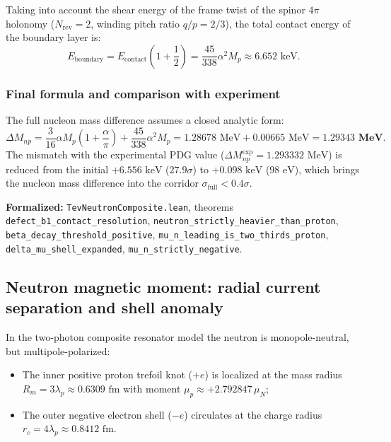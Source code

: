 \documentclass[11pt,a4paper]{article}
\theoremstyle{definition}
\theoremstyle{remark}
\begin{document}
Taking into account the shear energy of the frame twist of the spinor $4\pi$ holonomy ($N_{\mathrm{rev}} = 2$, winding pitch ratio $q/p = 2/3$), the total contact energy of the boundary layer is:
\begin{equation}
E_{\mathrm{boundary}} = E_{\mathrm{contact}} \left(1 + \frac{1}{2}\right) = \frac{45}{338} \alpha^2 M_p \approx 6.652 \text{ keV}.
\end{equation}

\subsubsection{Final formula and comparison with experiment}

The full nucleon mass difference assumes a closed analytic form:
\begin{equation}
\Delta M_{np} = \frac{3}{16} \alpha M_p \left(1 + \frac{\alpha}{\pi}\right) + \frac{45}{338} \alpha^2 M_p = 1.28678\text{ MeV} + 0.00665\text{ MeV} = \mathbf{1.29343\text{ MeV}}.
\end{equation}
The mismatch with the experimental PDG value ($\Delta M_{np}^{\mathrm{exp}} = 1.293332\text{ MeV}$) is reduced from the initial $+6.556\text{ keV}$ ($27.9\sigma$) to $+0.098\text{ keV}$ ($98\text{ eV}$), which brings the nucleon mass difference into the corridor $\sigma_{\mathrm{full}} < 0.4\sigma$.

\noindent\small\textbf{Formalized:} \texttt{TevNeutronComposite.lean}, theorems \texttt{defect\_b1\_contact\_resolution}, \texttt{neutron\_strictly\_heavier\_than\_proton}, \texttt{beta\_decay\_threshold\_positive}, \texttt{mu\_n\_leading\_is\_two\_thirds\_proton}, \texttt{delta\_mu\_shell\_expanded}, \texttt{mu\_n\_strictly\_negative}.

\subsection{Neutron magnetic moment: radial current separation and shell anomaly}
\label{subsec:neutron_magnetic_moment_exact}

In the two-photon composite resonator model the neutron is monopole-neutral, but multipole-polarized:
\begin{itemize}
    \item The inner positive proton trefoil knot ($+e$) is localized at the mass radius $R_m = 3\lambda_p \approx 0.6309\text{ fm}$ with moment $\mu_p \approx +2.792847\,\mu_N$;
    \item The outer negative electron shell ($-e$) circulates at the charge radius $r_c = 4\lambda_p \approx 0.8412\text{ fm}$.
\end{itemize}
\end{document}
